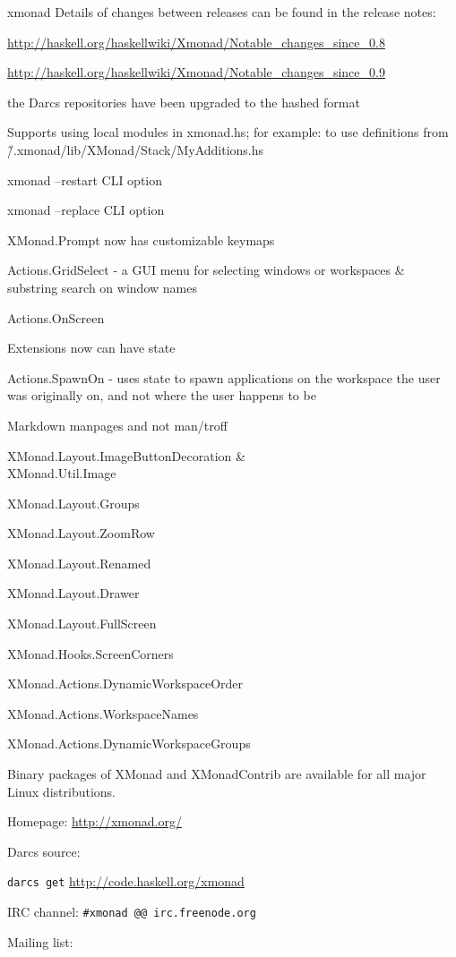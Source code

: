 \begin{hcarentry}[updated]{xmonad}
Details of changes between releases can be found in the release notes:
\begin{compactitem}
\item \url{http://haskell.org/haskellwiki/Xmonad/Notable_changes_since_0.8}
\item \url{http://haskell.org/haskellwiki/Xmonad/Notable_changes_since_0.9}
\item the Darcs repositories have been upgraded to the hashed format
\item Supports using local modules in xmonad.hs; for example: to use definitions from \~/.xmonad/lib/XMonad/Stack/MyAdditions.hs
\item xmonad --restart CLI option
\item xmonad --replace CLI option
\item XMonad.Prompt now has customizable keymaps
\item Actions.GridSelect - a GUI menu for selecting windows or workspaces \& substring search on window names
\item Actions.OnScreen
\item Extensions now can have state
\item Actions.SpawnOn - uses state to spawn applications on the workspace the user was originally on,
  and not where the user happens to be
\item Markdown manpages and not man/troff
\item  XMonad.Layout.ImageButtonDecoration \&\\ XMonad.Util.Image
\item XMonad.Layout.Groups
\item XMonad.Layout.ZoomRow
\item XMonad.Layout.Renamed
\item XMonad.Layout.Drawer
\item XMonad.Layout.FullScreen
\item XMonad.Hooks.ScreenCorners
\item XMonad.Actions.DynamicWorkspaceOrder
\item XMonad.Actions.WorkspaceNames
\item XMonad.Actions.DynamicWorkspaceGroups
\end{compactitem}

Binary packages of XMonad and XMonadContrib are available for all major Linux distributions.

\FurtherReading
\begin{compactitem}
\item Homepage:
 \url{http://xmonad.org/}

\item Darcs source:

 \texttt{darcs get} \url{http://code.haskell.org/xmonad}

\item IRC channel:
 \verb+#xmonad @@ irc.freenode.org+

\item Mailing list:
\end{compactitem}
\end{hcarentry}
